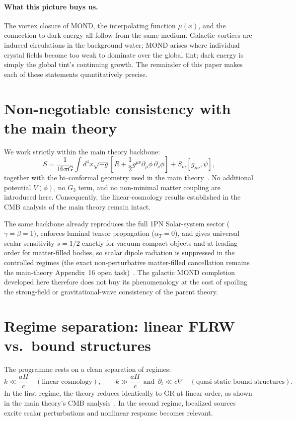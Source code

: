 \documentclass[11pt]{article}
\begin{document}
\paragraph{What this picture buys us.}
The vortex closure of MOND, the interpolating function $\mu(x)$, and the connection to dark energy all follow from the same medium. Galactic vortices are induced circulations in the background water; MOND arises where individual crystal fields become too weak to dominate over the global tint; dark energy is simply the global tint's continuing growth. The remainder of this paper makes each of these statements quantitatively precise.

\section{Non-negotiable consistency with the main theory}\label{sec:consistency}
We work strictly within the main theory backbone:
\begin{equation}
S=\frac{1}{16\pi G}\int d^4x\sqrt{-g}\left[R+\frac12 g^{\mu\nu}\partial_\mu\phi\,\partial_\nu\phi\right]+S_m[g_{\mu\nu},\psi],
\label{eq:action}
\end{equation}
together with the bi--conformal geometry used in the main theory~\cite{Lotishvili2026}. No additional potential $V(\phi)$, no $G_3$ term, and no non-minimal matter coupling are introduced here. Consequently, the linear-cosmology results established in the CMB analysis of the main theory remain intact.

The same backbone already reproduces the full 1PN Solar-system
sector ($\gamma=\beta=1$), enforces luminal tensor propagation
($\alpha_T=0$), and gives universal scalar sensitivity
$s=1/2$ exactly for vacuum compact objects and at leading order
for matter-filled bodies, so scalar dipole radiation is suppressed
in the controlled regimes (the exact non-perturbative
matter-filled cancellation remains the main-theory Appendix~16
open task)~\cite{Lotishvili2026}.
The galactic MOND completion developed here therefore does not
buy its phenomenology at the cost of spoiling the strong-field
or gravitational-wave consistency of the parent theory.

\section{Regime separation: linear FLRW vs.\ bound structures}\label{sec:regime}
The programme rests on a clean separation of regimes:
\begin{equation}
k \ll \frac{aH}{c}\quad (\text{linear cosmology}),\qquad
k \gg \frac{aH}{c}\ \ \text{and}\ \ \partial_t\ll c\nabla\quad (\text{quasi-static bound structures}).
\label{eq:scaleseparation}
\end{equation}
In the first regime, the theory reduces identically to GR at linear order, as shown in the main theory's CMB analysis~\cite{Lotishvili2026}. In the second regime, localized sources excite scalar perturbations and nonlinear response becomes relevant.
\end{document}

